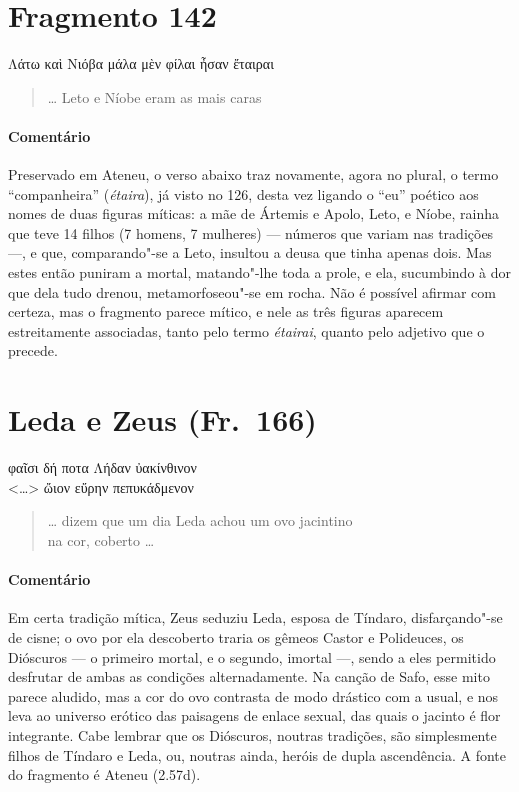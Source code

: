 {\pagebreak
\section{Fragmento 142}

\begin{gkverse}
Λάτω καὶ Νιόβα μάλα μὲν φίλαι ἦσαν ἔταιραι
\end{gkverse}

\begin{verse}
\ldots{} Leto e Níobe eram as mais caras 
\end{verse}

{\paragraph{Comentário} Preservado em Ateneu, o verso abaixo traz novamente,
agora no plural, o termo ``companheira” (\textit{étaira}), já visto no
126, desta vez ligando o “eu” poético aos nomes de duas figuras míticas: a mãe de
Ártemis e Apolo, Leto, e Níobe, rainha que teve 14 filhos (7 homens, 7
mulheres) --- números que variam nas tradições ---, e que, comparando"-se a Leto, insultou a deusa que tinha apenas dois.
Mas estes então puniram a mortal, matando"-lhe toda a prole, e ela, sucumbindo à dor que dela tudo drenou, metamorfoseou"-se em rocha. Não é possível afirmar
com certeza, mas o fragmento parece mítico, e nele as três figuras aparecem
estreitamente associadas, tanto pelo termo \textit{étairai}, quanto pelo
adjetivo que o precede.}



\pagebreak
\section{Leda e Zeus (Fr.~166)}

\begin{gkverse}
φαῖσι δή ποτα Λήδαν ὐακίνθινον\\
<\ldots{}> ὤιον εὔρην πεπυκάδμενον
\end{gkverse}

\begin{verse}
\ldots{} dizem que um dia Leda achou um ovo jacintino\\
na cor, coberto \ldots{}
\end{verse}

{\paragraph{Comentário} Em certa tradição mítica, Zeus seduziu Leda, esposa de Tíndaro, disfarçando"-se
de cisne; o ovo por ela descoberto traria os gêmeos Castor e Polideuces, os
Dióscuros --- o primeiro mortal, e o segundo, imortal ---, sendo a eles
permitido desfrutar de ambas as condições alternadamente. Na canção de Safo,
esse mito parece aludido, mas a cor do ovo contrasta de modo drástico com a usual,
e nos leva ao universo erótico das paisagens de enlace sexual, das quais o
jacinto é flor integrante. Cabe lembrar que os Dióscuros, noutras tradições,
são simplesmente filhos de Tíndaro e Leda, ou, noutras ainda, heróis de dupla
ascendência. A fonte do fragmento é Ateneu (2.57d).}




}
